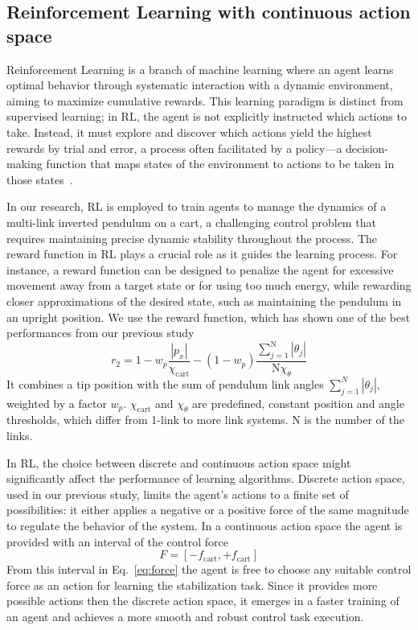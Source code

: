 \subsection{Reinforcement Learning with continuous action space}
Reinforcement Learning is a branch of machine learning where an agent learns optimal behavior through systematic interaction with a dynamic environment, aiming to maximize cumulative rewards. This learning paradigm is distinct from supervised learning; in RL, the agent is not explicitly instructed which actions to take. Instead, it must explore and discover which actions yield the highest rewards by trial and error, a process often facilitated by a policy—a decision-making function that maps states of the environment to actions to be taken in those states~\cite{sutton_reinforcement_2018}.

In our research, RL is employed to train agents to manage the dynamics of a multi-link inverted pendulum on a cart, a challenging control problem that requires maintaining precise dynamic stability throughout the process. The reward function in RL plays a crucial role as it guides the learning process. For instance, a reward function can be designed to penalize the agent for excessive movement away from a target state or for using too much energy, while rewarding closer approximations of the desired state, such as maintaining the pendulum in an upright position. We use the reward function, which has shown one of the best performances from our previous study
\begin{equation}
r_2 = 1 - w_p \frac{\left|p_x\right|}{\chi_\mathrm{cart}} - (1-w_p) \frac{\sum_{j=1}^\mathrm{N} \left|\theta_j\right|}{\mathrm{N} \chi_{\theta}} 
\label{eq:reward2}
\end{equation}
It combines a tip position with the sum of pendulum link angles $\sum_{j=1}^{N} \left|\theta_j\right|$, weighted by a factor $w_p$. $\chi_\mathrm{cart}$ and $\chi_{\theta}$ are predefined, constant position and angle thresholds, which differ from 1-link to more link systems. $\mathrm{N}$ is the number of the links.

In RL, the choice between discrete and continuous action space might significantly affect the performance of learning algorithms. Discrete action space, used in our previous study, limits the agent’s actions to a finite set of possibilities: it either applies a negative or a positive force of the same magnitude to regulate the behavior of the system. In a continuous action space the agent is provided with an interval of the control force
\begin{equation}
F = [-f_\mathrm{cart}, +f_\mathrm{cart}]
\label{eq:force}
\end{equation}
From this interval in Eq.~\eqref{eq:force} the agent is free to choose any suitable control force as an action for learning the stabilization task. Since it provides more possible actions then the discrete action space, it emerges in a faster training of an agent and achieves a more smooth and robust control task execution.  

